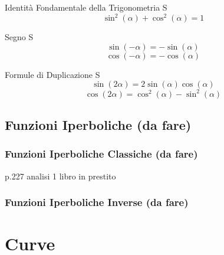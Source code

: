 \documentclass{article}  %
\begin{document}
\begin{definition}{Identità Fondamentale della Trigonometria}
	S\[
		\sin^2(\alpha)+\cos^2(\alpha)=1
	\]
\end{definition}
\begin{definition}{Segno}
	S\[
		\sin(-\alpha)=-\sin(\alpha)
	\]
	\[
		\cos(-\alpha)=-\cos(\alpha)
	\]
\end{definition}
\begin{definition}{Formule di Duplicazione}
	S\[
		\sin(2\alpha)=2\sin(\alpha)\cos(\alpha)
	\]
	\[
		\cos(2\alpha)=\cos^2(\alpha)-\sin^2(\alpha)
	\]
\end{definition}

\subsection{Funzioni Iperboliche (da fare)}
\subsubsection{Funzioni Iperboliche Classiche (da fare)}
p.227 analisi 1 libro in prestito
\subsubsection{Funzioni Iperboliche Inverse (da fare)}
\newpage
\section{Curve}
\end{document}
